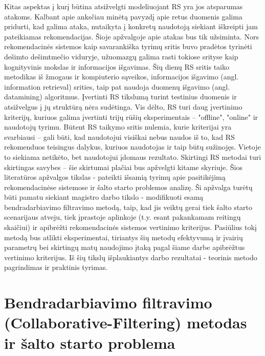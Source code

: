 \documentclass{VUMIFInfMagistrinis}
\begin{document}
\newline
\indent
Kitas aspektas į kurį būtina atsižvelgti modeliuojant RS yra jos atsparumas atakoms. Kalbant apie anksčiau minėtą pavyzdį apie retus duomenis galima pridurti, kad galima ataka, nutaikyta į konkretų naudotoją siekiant iškreipti jam pateikiamas rekomendacijas. Šioje apžvalgoje apie atakas bus tik užsiminta. 
\newline
\indent
Nors rekomendacinės sistemos kaip savarankiška tyrimų sritis buvo pradėtos tyrinėti dešimto dešimtmečio viduryje, užuomazgų galima rasti tokiose srityse kaip kognityvinis mokslas ir informacijos išgavimas. Šių dienų RS sritis taiko metodikas iš žmogaus ir kompiuterio sąveikos, informacijos išgavimo (angl. information retrieval) srities, taip pat naudoja duomenų išgavimo (angl. datamining) algoritmus.
\newline
\indent
Įvertinti RS tikslumą turint testinius duomenis ir atsižvelgus į jų struktūrą nėra sudėtinga. Vis dėlto, RS turi daug įvertinimo kriterijų, kuriuos galima įvertinti trijų rūšių eksperimentais – "offline", "online" ir naudotojų tyrimu. Būtent RS taikymo sritis nulemia, kurie kriterijai yra svarbiausi – gali būti, kad naudotojui visiškai nebus naudos iš to, kad RS rekomenduos teisingus dalykus, kuriuos naudotojas ir taip būtų sužinojęs. Vietoje to siekiama netikėto, bet naudotojui įdomaus rezultato. Skirtingi RS metodai turi skirtingas savybes – šie skirtumai plačiai bus apžvelgti kitame skyriuje. 
\newline
\indent
Šios literatūros apžvalgos tikslas - pateikti išsamią tyrimų apie pasitikėjimą rekomendacinėse sistemose ir šalto starto problemos analizę. Ši apžvalga turėtų būti pamatu siekiant magistro darbo tikslo - modifikuoti esamą bendradarbiavimo filtravimo metodą, taip, kad jis veiktų gerai tiek šalto starto scenarijaus atveju, tiek įprastoje aplinkoje (t.y. esant pakankamam reitingų skaičiui) ir apibrėžti rekomendacinės sistemos vertinimo kriterijus. Pasiūlius tokį metodą bus atlikti eksperimentai, tiriantys šių metodų efektyvumą ir įvairių parametrų bei skirtingų matų naudojimo įtaką pagal šiame darbe apibrėžtus vertinimo kriterijus. Iš šių tikslų išplaukiantys darbo rezultatai - teorinis metodo pagrindimas ir praktinis tyrimas.


\section{Bendradarbiavimo filtravimo (Collaborative-Filtering) metodas ir šalto starto problema}
\end{document}
